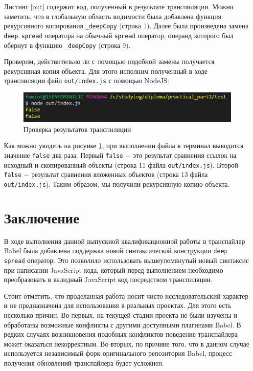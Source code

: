 \documentclass[14pt, a4paper]{article}
\def\code#1{\texttt{#1}} %
\begin{document}


Листинг \ref{out} содержит код, полученный в результате транспиляции. Можно заметить, что в глобальную
область видимости была добавлена функция рекурсивного копирования \code{\_deepCopy} (строка 1).
Далее была произведена замена \code{deep spread} оператора на обычный \code{spread} оператор, операнд
которого был обернут в функцию \code{\_deepCopy} (строка 9).

Проверим, действительно ли с помощью подобной замены получается рекурсивная копия объекта. Для этого
исполним полученный в ходе транспиляции файл \code{out/index.js} с помощью NodeJS:

\begin{figure}[H]
  \centering
  \includegraphics[scale=1.0]{img/test_results.PNG}
  \caption{Проверка результатов транспиляции}
  \label{test_results}
\end{figure}
Как можно увидеть на рисунке \ref{test_results}, при выполнении файла в терминал выводится значение
\code{false} два раза. Первый \code{false} $-$ это результат сравнения ссылок на исходный и
скопированный объекты (строка 11 файла \code{out/index.js}). Второй \code{false} $-$ результат сравнения
вложенных объектов (строка 13 файла \code{out/index.js}). Таким образом, мы получили рекурсивную копию
объекта.

\pagebreak
\section{Заключение}
В ходе выполнения данной выпускной квалификационной работы в транспайлер Babel была добавлена
поддержка новой синтаксической конструкции \code{deep spread} оператор. Это позволило использовать
вышеупомянутый новый синтаксис при написании JavaScript кода, который перед выполнением необходимо
преобразовать в валидный JavaScript код посредством транспиляции.

Стоит отметить, что проделанная работа носит чисто исследовательский характер и не предназначена для
использования в реальных проектах. Для этого есть несколько причин. Во-первых, на текущей стадии
проекта не были изучены и обработаны возможные конфликты с другими доступными плагинами Babel. В
редких случаях возникновения подобных конфликтов поведение транспайлера может оказаться некорректным.
Во-вторых, по причине того, что в данном случае используется независимый форк оригинального репозитория
Babel, процесс получения обновлений транспайлера будет усложнен.
\end{document}
